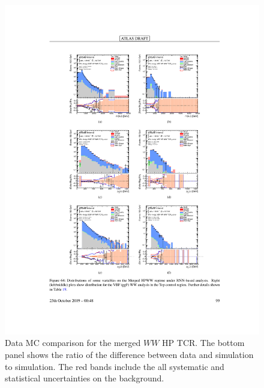 \begin{figure}[h!]
  \centering
  \includegraphics[width=\hsize , height=\textheight , keepaspectratio]{figures/Analysis/datamc/merged_hp_ww_tcr.pdf}
    \caption{Data MC comparison for the merged $WW$ HP TCR. The bottom panel shows the ratio of the difference between data and simulation to simulation. The red bands include the all systematic and statistical uncertainties on the background. } 
  \label{fig:merged_hp_ww_TCR_datamc}
\end{figure} 
\FloatBarrier


